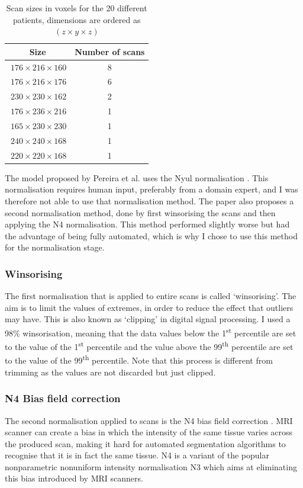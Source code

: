 \documentclass[12pt,a4paper,twoside,openright]{report}
\begin{document}
\begin{table}[h]
\centering	
\label{table:scan_sizes}
\begin{tabular}{ c c } 
\textbf{Size} & \textbf{Number of scans}\\
 \hline
 $\ 176 \times 216 \times 160$ & 8 \\ 
 $\ 176 \times 216 \times 176$ & 6 \\ 
 $\ 230 \times 230 \times 162$ & 2 \\ 
 $\ 176 \times 236 \times 216$ & 1 \\ 
 $\ 165 \times 230 \times 230$ & 1 \\ 
 $\ 240 \times 240 \times 168$ & 1 \\ 
 $\ 220 \times 220 \times 168$ & 1 \\ 

\end{tabular}
\caption{Scan sizes in voxels for the 20 different patients, dimensions are ordered as $(z \times y \times z)$}
\end{table}

The model proposed by Pereira et al. \cite{pereira} uses the Nyul normalisation \cite{nyul}. This normalisation requires human input, preferably from a domain expert, and I was therefore not able to use that normalisation method. The paper also proposes a second normalisation method, done by first winsorising the scans and then applying the N4 normalisation. This method performed slightly worse but had the advantage of being fully automated, which is why I chose to use this method for the normalisation stage.

\subsubsection{Winsorising}
The first normalisation that is applied to entire scans is called `winsorising'. The aim is to limit the values of extremes, in order to reduce the effect that outliers may have. This is also known as `clipping' in digital signal processing. I used a 98\% winsorisation, meaning that the data values below the 1\textsuperscript{st} percentile are set to the value of the 1\textsuperscript{st} percentile and the value above the 99\textsuperscript{th} percentile are set to the value of the 99\textsuperscript{th} percentile. Note that this process is different from trimming as the values are not discarded but just clipped.

\subsubsection{N4 Bias field correction}
The second normalisation applied to scans is the N4 bias field correction \cite{n4itk}. MRI scanner can create a bias in which the intensity of the same tissue varies across the produced scan, making it hard for automated segmentation algorithms to recognise that it is in fact the same tissue. N4 is a variant of the popular nonparametric nonuniform intensity normalisation N3 which aims at eliminating this bias introduced by MRI scanners. 
\end{document}

